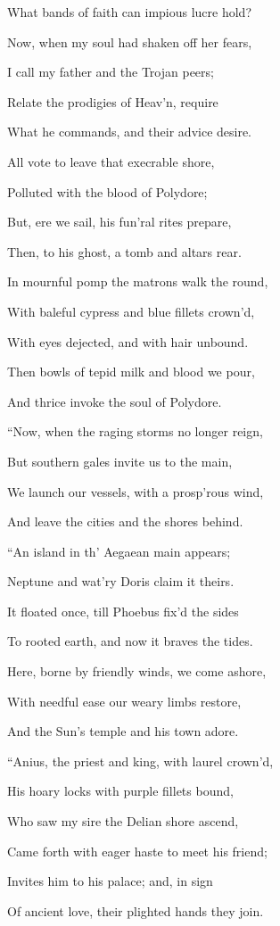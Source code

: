 What bands of faith can impious lucre hold?

Now, when my soul had shaken off her fears,

I call my father and the Trojan peers;

Relate the prodigies of Heav’n, require

What he commands, and their advice desire.

All vote to leave that execrable shore,

Polluted with the blood of Polydore;

But, ere we sail, his fun’ral rites prepare,

Then, to his ghost, a tomb and altars rear.

In mournful pomp the matrons walk the round,

With baleful cypress and blue fillets crown’d,

With eyes dejected, and with hair unbound.

Then bowls of tepid milk and blood we pour,

And thrice invoke the soul of Polydore.

“Now, when the raging storms no longer reign,

But southern gales invite us to the main,

We launch our vessels, with a prosp’rous wind,

And leave the cities and the shores behind.

“An island in th’ Aegaean main appears;

Neptune and wat’ry Doris claim it theirs.

It floated once, till Phoebus fix’d the sides

To rooted earth, and now it braves the tides.

Here, borne by friendly winds, we come ashore,

With needful ease our weary limbs restore,

And the Sun’s temple and his town adore.

“Anius, the priest and king, with laurel crown’d,

His hoary locks with purple fillets bound,

Who saw my sire the Delian shore ascend,

Came forth with eager haste to meet his friend;

Invites him to his palace; and, in sign

Of ancient love, their plighted hands they join.

